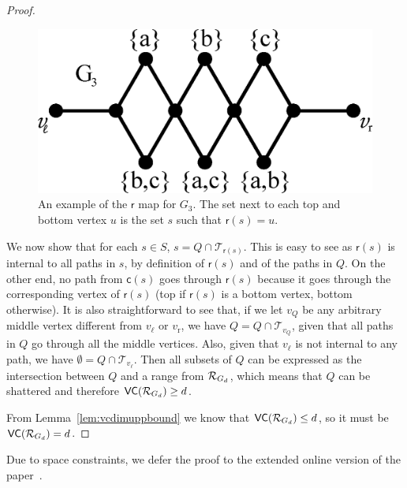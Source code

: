 \begin{proof}
  \begin{figure}[ht]
    \centering
    \includegraphics[scale=0.4]{figures/eps/tight-mapexample}
    \caption{An example of the $\mathsf{r}$ map for $G_3$. The set next to
    each top and bottom vertex $u$ is the set $s$ such that $\mathsf{r}(s)=u$.}
    \label{fig:mapexample}
  \end{figure}
  
  We now show that for each $s\in S$, $s=Q\cap\mathcal{T}_{\mathsf{r}(s)}$. This
  is easy to see as $\mathsf{r}(s)$ is internal to all paths in $s$, by
  definition of $\mathsf{r}(s)$ and of the paths in $Q$. On the other end, no
  path from $\mathsf{c}(s)$ goes through $\mathsf{r}(s)$ because it goes through
  the corresponding vertex of $\mathsf{r}(s)$ (top if $\mathsf{r}(s)$ is a
  bottom vertex, bottom otherwise). It is also straightforward to see that,
  if we let $v_Q$ be any arbitrary middle vertex different from $v_\ell$
  or $v_\mathrm{r}$, we have $Q=Q\cap\mathcal{T}_{v_Q}$, given that all paths in
  $Q$ go through all the middle vertices. Also, given that $v_\ell$ is not
  internal to any path, we have $\emptyset=Q\cap\mathcal{T}_{v_\ell}$. Then all
  subsets of $Q$ can be expressed as the intersection between $Q$ and a range
  from $\mathcal{R}_{G_d}$, which means that $Q$ can be shattered and therefore
  $\mathsf{VC}(\mathcal{R}_{G_d})\ge d$.

  From Lemma~\ref{lem:vcdimuppbound} we know that $\mathsf{VC}(\mathcal{R}_{G_d})\le d$, so
  it must be $\mathsf{VC}(\mathcal{R}_{G_d})=d$.
\end{proof}
\else
Due to space constraints, we defer the proof to the extended online version of
the paper~\citep{RiondatoK13}.
\fi

